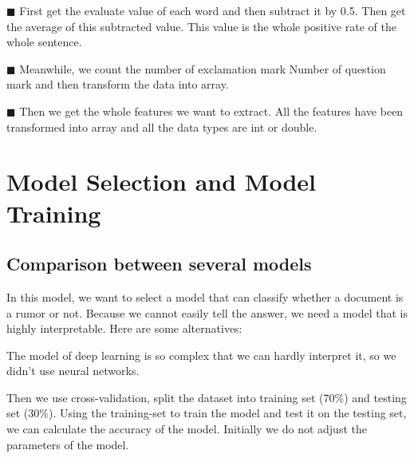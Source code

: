 \documentclass[12pt,a4paper]{article}
\begin{document}
 \setlength{\hangindent}{4em}
$\blacksquare$ First get the evaluate value of each word and then subtract it by 0.5. Then get the average of this subtracted value. This value is the whole positive rate of the whole sentence.

 \setlength{\hangindent}{4em}
$\blacksquare$ Meanwhile, we count the number of exclamation mark Number of question mark and then transform the data into array.

 \setlength{\hangindent}{4em}
$\blacksquare$ Then we get the whole features we want to extract. All the features have been transformed into array and all the data types are int or double. 


\section{Model Selection and Model Training}
\subsection{Comparison between several models}
In this model, we want to select a model that can classify whether a document is a rumor or not.
Because we cannot easily tell the answer, we need a model that is highly interpretable.  Here are some alternatives:

\vspace{10pt}
\setlength{\parindent}{5em}
\vspace{10pt}

\setlength{\parindent}{2em}
The model of deep learning is so complex that we can hardly interpret it, so we didn't use neural networks.

Then we use cross-validation, split the dataset into training set (70\%) and testing set (30\%). Using the training-set to train the model and test it on the testing set, we can calculate the accuracy of the model. 
Initially we do not adjust the parameters of the model. 
\end{document}
